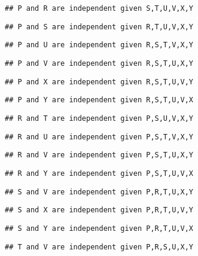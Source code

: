 \documentclass[
]{article}
\begin{document}
\begin{verbatim}
## P and R are independent given S,T,U,V,X,Y
\end{verbatim}

\begin{verbatim}
## P and S are independent given R,T,U,V,X,Y
\end{verbatim}

\begin{verbatim}
## P and U are independent given R,S,T,V,X,Y
\end{verbatim}

\begin{verbatim}
## P and V are independent given R,S,T,U,X,Y
\end{verbatim}

\begin{verbatim}
## P and X are independent given R,S,T,U,V,Y
\end{verbatim}

\begin{verbatim}
## P and Y are independent given R,S,T,U,V,X
\end{verbatim}

\begin{verbatim}
## R and T are independent given P,S,U,V,X,Y
\end{verbatim}

\begin{verbatim}
## R and U are independent given P,S,T,V,X,Y
\end{verbatim}

\begin{verbatim}
## R and V are independent given P,S,T,U,X,Y
\end{verbatim}

\begin{verbatim}
## R and Y are independent given P,S,T,U,V,X
\end{verbatim}

\begin{verbatim}
## S and V are independent given P,R,T,U,X,Y
\end{verbatim}

\begin{verbatim}
## S and X are independent given P,R,T,U,V,Y
\end{verbatim}

\begin{verbatim}
## S and Y are independent given P,R,T,U,V,X
\end{verbatim}

\begin{verbatim}
## T and V are independent given P,R,S,U,X,Y
\end{verbatim}
\end{document}

